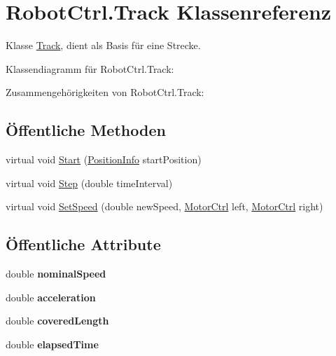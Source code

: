 \hypertarget{class_robot_ctrl_1_1_track}{
\section{RobotCtrl.Track Klassenreferenz}
\label{class_robot_ctrl_1_1_track}
}


Klasse \hyperlink{class_robot_ctrl_1_1_track}{Track}, dient als Basis f\"{u}r eine Strecke.  




Klassendiagramm für RobotCtrl.Track:

Zusammengehörigkeiten von RobotCtrl.Track:\subsection*{Öffentliche Methoden}
\begin{DoxyCompactItemize}
\item 
virtual void \hyperlink{class_robot_ctrl_1_1_track_a91c0b372e1c332ae1aa18368df116633}{Start} (\hyperlink{struct_robot_ctrl_1_1_position_info}{PositionInfo} startPosition)
\item 
virtual void \hyperlink{class_robot_ctrl_1_1_track_a82386b9a49faa6a31d9706f39238f21b}{Step} (double timeInterval)
\item 
virtual void \hyperlink{class_robot_ctrl_1_1_track_a9abc3ccf4bf1d9db8d461f2cb4b4b0d3}{SetSpeed} (double newSpeed, \hyperlink{class_robot_ctrl_1_1_motor_ctrl}{MotorCtrl} left, \hyperlink{class_robot_ctrl_1_1_motor_ctrl}{MotorCtrl} right)
\end{DoxyCompactItemize}
\subsection*{Öffentliche Attribute}
\begin{DoxyCompactItemize}
\item 
\hypertarget{class_robot_ctrl_1_1_track_a7d996b14578c6059e6868e2210e1d582}{
double {\bfseries nominalSpeed}}
\label{class_robot_ctrl_1_1_track_a7d996b14578c6059e6868e2210e1d582}

\item 
\hypertarget{class_robot_ctrl_1_1_track_abf40e28208ac9861b7f75042fcb68d20}{
double {\bfseries acceleration}}
\label{class_robot_ctrl_1_1_track_abf40e28208ac9861b7f75042fcb68d20}

\item 
\hypertarget{class_robot_ctrl_1_1_track_a590aa4c79e81feedcc5116a874d88e4d}{
double {\bfseries coveredLength}}
\label{class_robot_ctrl_1_1_track_a590aa4c79e81feedcc5116a874d88e4d}

\item 
\hypertarget{class_robot_ctrl_1_1_track_a17436774d1af50ddffc88f505728f713}{
double {\bfseries elapsedTime}}
\label{class_robot_ctrl_1_1_track_a17436774d1af50ddffc88f505728f713}

\end{DoxyCompactItemize}
